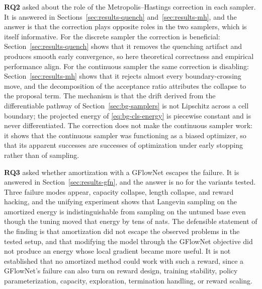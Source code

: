 \textbf{RQ2} asked about the role of the Metropolis--Hastings correction in each sampler. It is answered in Sections~\ref{sec:results-quench} and~\ref{sec:results-mh}, and the answer is that the correction plays opposite roles in the two samplers, which is itself informative. For the discrete sampler the correction is beneficial: Section~\ref{sec:results-quench} shows that it removes the quenching artifact and produces smooth early convergence, so here theoretical correctness and empirical performance align. For the continuous sampler the same correction is disabling: Section~\ref{sec:results-mh} shows that it rejects almost every boundary-crossing move, and the decomposition of the acceptance ratio attributes the collapse to the proposal term. The mechanism is that the drift derived from the differentiable pathway of Section~\ref{sec:bg-samplers} is not Lipschitz across a cell boundary; the projected energy of \eqref{eq:bg-cls-energy} is piecewise constant and is never differentiated. The correction does not make the continuous sampler work: it shows that the continuous sampler was functioning as a biased optimizer, so that its apparent successes are successes of optimization under early stopping rather than of sampling.

\textbf{RQ3} asked whether amortization with a GFlowNet escapes the failure. It is answered in Section~\ref{sec:results-gfn}, and the answer is no for the variants tested. Three failure modes appear, capacity collapse, length collapse, and reward hacking, and the unifying experiment shows that Langevin sampling on the amortized energy is indistinguishable from sampling on the untuned base even though the tuning moved that energy by tens of nats. The defensible statement of the finding is that amortization did not escape the observed problems in the tested setup, and that modifying the model through the GFlowNet objective did not produce an energy whose local gradient became more useful. It is not established that no amortized method could work with such a reward, since a GFlowNet's failure can also turn on reward design, training stability, policy parameterization, capacity, exploration, termination handling, or reward scaling.

